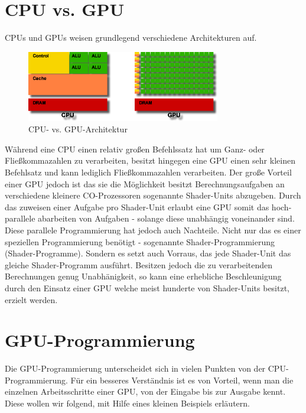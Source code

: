 \begin{Spacing}{\mylinespace}
\section{CPU vs. GPU}
CPUs und GPUs weisen grundlegend verschiedene Architekturen auf.
\begin{figure}[h!]
	\vspace*{30px}
	\centering
	\includegraphics[width=320px]{graphics/GPUvsCPU.png}	
	\caption{CPU- vs. GPU-Architektur}
	\label{fig:GPUvsCPU}
\end{figure}

Während eine CPU einen relativ großen Befehlssatz hat um Ganz- oder Fließkommazahlen zu verarbeiten, besitzt hingegen eine GPU einen sehr kleinen Befehlsatz und kann lediglich Fließkommazahlen verarbeiten.
Der große Vorteil einer GPU jedoch ist das sie die Möglichkeit besitzt Berechnungsaufgaben an verschiedene kleinere CO-Prozessoren sogenannte Shader-Units abzugeben. Durch das zuweisen einer Aufgabe pro Shader-Unit erlaubt eine GPU somit das hoch-parallele abarbeiten von Aufgaben - solange diese unabhängig voneinander sind.
Diese parallele Programmierung hat jedoch auch Nachteile.
Nicht nur das es einer speziellen Programmierung benötigt - sogenannte Shader-Programmierung (Shader-Programme).
Sondern es setzt auch Vorraus, das jede Shader-Unit das gleiche Shader-Programm ausführt. Besitzen jedoch die zu verarbeitenden Berechnungen genug Unabhänigkeit, so kann eine erhebliche Beschleunigung durch den Einsatz einer GPU welche meist hunderte von Shader-Units besitzt, erzielt werden.


\section{GPU-Programmierung}

Die GPU-Programmierung unterscheidet sich in vielen Punkten von der CPU-Programmierung. Für ein besseres Verständnis ist es von Vorteil, wenn man die einzelnen Arbeitsschritte einer GPU, von der Eingabe bis zur Ausgabe kennt. Diese wollen wir folgend, mit Hilfe eines kleinen Beispiels erläutern.


\end{Spacing}
